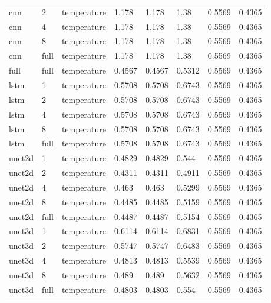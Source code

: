 \begin{table}[htbp]
\begin{tabular}{llllllll}
cnn & 2 & temperature & 1.178 & 1.178 & 1.38 & 0.5569 & 0.4365 \\
cnn & 4 & temperature & 1.178 & 1.178 & 1.38 & 0.5569 & 0.4365 \\
cnn & 8 & temperature & 1.178 & 1.178 & 1.38 & 0.5569 & 0.4365 \\
cnn & full & temperature & 1.178 & 1.178 & 1.38 & 0.5569 & 0.4365 \\
full & full & temperature & 0.4567 & 0.4567 & 0.5312 & 0.5569 & 0.4365 \\
lstm & 1 & temperature & 0.5708 & 0.5708 & 0.6743 & 0.5569 & 0.4365 \\
lstm & 2 & temperature & 0.5708 & 0.5708 & 0.6743 & 0.5569 & 0.4365 \\
lstm & 4 & temperature & 0.5708 & 0.5708 & 0.6743 & 0.5569 & 0.4365 \\
lstm & 8 & temperature & 0.5708 & 0.5708 & 0.6743 & 0.5569 & 0.4365 \\
lstm & full & temperature & 0.5708 & 0.5708 & 0.6743 & 0.5569 & 0.4365 \\
unet2d & 1 & temperature & 0.4829 & 0.4829 & 0.544 & 0.5569 & 0.4365 \\
unet2d & 2 & temperature & 0.4311 & 0.4311 & 0.4911 & 0.5569 & 0.4365 \\
unet2d & 4 & temperature & 0.463 & 0.463 & 0.5299 & 0.5569 & 0.4365 \\
unet2d & 8 & temperature & 0.4485 & 0.4485 & 0.5159 & 0.5569 & 0.4365 \\
unet2d & full & temperature & 0.4487 & 0.4487 & 0.5154 & 0.5569 & 0.4365 \\
unet3d & 1 & temperature & 0.6114 & 0.6114 & 0.6831 & 0.5569 & 0.4365 \\
unet3d & 2 & temperature & 0.5747 & 0.5747 & 0.6483 & 0.5569 & 0.4365 \\
unet3d & 4 & temperature & 0.4813 & 0.4813 & 0.5539 & 0.5569 & 0.4365 \\
unet3d & 8 & temperature & 0.489 & 0.489 & 0.5632 & 0.5569 & 0.4365 \\
unet3d & full & temperature & 0.4803 & 0.4803 & 0.554 & 0.5569 & 0.4365 \\
\bottomrule
\end{tabular}
\end{table}
